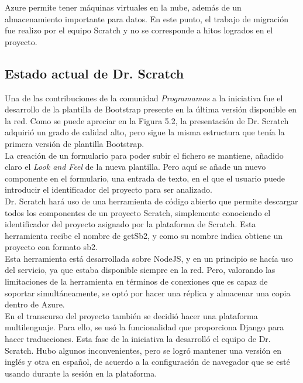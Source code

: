 \documentclass[a4paper, 12pt]{book}
\begin{document}
Azure permite tener máquinas virtuales en la nube, además de un almacenamiento importante
para datos. En este punto, el trabajo de migración fue realizo por el equipo Scratch y no
se corresponde a hitos logrados en el proyecto.


\subsection{Estado actual de Dr. Scratch}


Una de las contribuciones de la comunidad \emph{Programamos} a la iniciativa fue el 
desarrollo de la plantilla de Bootstrap presente en la última versión disponible en
la red. Como se puede apreciar en la Figura 5.2, la presentación de Dr. Scratch
adquirió un grado de calidad alto, pero sigue la misma estructura que tenía la primera
versión de plantilla Bootstrap. \\

La creación de un formulario para poder subir el fichero se mantiene, añadido claro
el \emph{Look and Feel} de la nueva plantilla. Pero aquí se añade un nuevo componente
en el formulario, una entrada de texto, en el que el usuario puede introducir el 
identificador del proyecto para ser analizado. \\

Dr. Scratch hará uso de una herramienta de código abierto que permite descargar todos
los componentes de un proyecto Scratch, simplemente conociendo el identificador del
proyecto asignado por la plataforma de Scratch. Esta herramienta recibe el nombre de
getSb2, y como su nombre indica obtiene un proyecto con formato sb2. \\

Esta herramienta está desarrollada sobre NodeJS, y en un principio se hacía uso del
servicio, ya que estaba disponible siempre en la red. Pero, valorando las limitaciones
de la herramienta en términos de conexiones que es capaz de soportar simultáneamente, 
se optó por hacer una réplica y almacenar una copia dentro de Azure. \\

En el transcurso del proyecto también se decidió hacer una plataforma multilenguaje. 
Para ello, se usó la funcionalidad que proporciona Django para hacer traducciones. 
Esta fase de la iniciativa la desarrolló el equipo de Dr. Scratch. Hubo algunos
inconvenientes, pero se logró mantener una versión en inglés y otra en español, de
acuerdo a la configuración de navegador que se esté usando durante la sesión en la
plataforma. \\ \\
\end{document}
